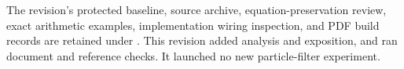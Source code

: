 \documentclass[11pt]{article}
\begin{document}
The revision's protected baseline, source archive, equation-preservation
review, exact arithmetic examples, implementation wiring inspection, and
PDF build records are retained under
.
This revision added analysis and exposition, and ran document and reference
checks. It launched no new particle-filter experiment.


\clearpage


\end{document}
